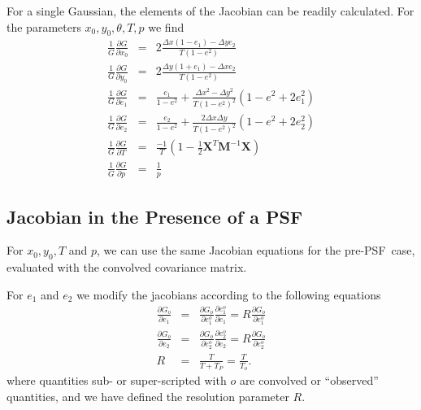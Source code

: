 \documentclass[10pt,preprint]{aastex}
\newcommand{\M}{\textbf{M}}
\newcommand{\X}{\textbf{X}}
\newcommand{\Dx}{\ensuremath{\Delta x}}
\newcommand{\Dy}{\ensuremath{\Delta y}}
\newcommand{\psf}{PSF}
\begin{document}
For a single Gaussian, the elements of the Jacobian can be readily
calculated.  For the parameters $x_0,y_0,\theta,T,p$ we find
\begin{eqnarray}
\frac{1}{G} \frac{\partial G}{\partial x_0}
    & = & 2 \frac{ \Dx (1-e_1) - \Dy e_2 }{T (1-e^2)} \\
\frac{1}{G} \frac{\partial G}{\partial y_0}
    & = & 2 \frac{ \Dy (1+e_1) - \Dx e_2 }{T (1-e^2)} \\
\frac{1}{G} \frac{\partial G}{\partial e_1}
  & = & \frac{e_1}{1-e^2} + \frac{\Dx^2-\Dy^2}{T (1-e^2)^2} (1-e^2 + 2 e_1^2) \\
\frac{1}{G} \frac{\partial G}{\partial e_2}
  & = & \frac{e_2}{1-e^2} + \frac{2 \Dx \Dy}{T (1-e^2)^2} (1-e^2 + 2 e_2^2) \\
\frac{1}{G} \frac{\partial G}{\partial T}
  & = & \frac{-1}{T} \left( 1 - \frac{1}{2} \X^T \M^{-1} \X  \right)  \\
\frac{1}{G} \frac{\partial G}{\partial p}
  & = & \frac{1}{p}
\end{eqnarray}

\subsection{Jacobian in the Presence of a \psf}

For $x_0,y_0,T$ and $p$, we can use the same Jacobian equations for the pre-\psf\
case, evaluated with the convolved covariance matrix. 

For $e_1$ and $e_2$ we modify the jacobians according to the following equations
\begin{eqnarray}
\frac{\partial G_o}{\partial e_1} 
 & = & \frac{\partial G_o}{\partial e_1^o} \frac{\partial e_1^o}{\partial e_1} 
    =  R \frac{\partial G_o}{\partial e_1^o}\\
\frac{\partial G_o}{\partial e_2} 
 & = & \frac{\partial G_o}{\partial e_2^o} \frac{\partial e_2^o}{\partial e_2}
    =  R \frac{\partial G_o}{\partial e_2^o}\\
R & = & \frac{T}{T + T_P} = \frac{T}{T_o}.
\end{eqnarray}
where quantities sub- or super-scripted with $o$ are convolved or ``observed''
quantities, and we have defined the resolution parameter $R$.
\end{document}
